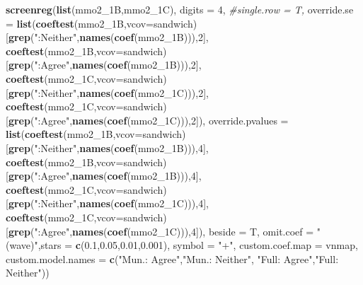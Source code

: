 \documentclass[
]{article}
\newenvironment{Shaded}{\begin{snugshade}}{\end{snugshade}}
\newcommand{\CommentTok}[1]{\textcolor[rgb]{0.56,0.35,0.01}{\textit{#1}}}
\newcommand{\DataTypeTok}[1]{\textcolor[rgb]{0.13,0.29,0.53}{#1}}
\newcommand{\DecValTok}[1]{\textcolor[rgb]{0.00,0.00,0.81}{#1}}
\newcommand{\FloatTok}[1]{\textcolor[rgb]{0.00,0.00,0.81}{#1}}
\newcommand{\KeywordTok}[1]{\textcolor[rgb]{0.13,0.29,0.53}{\textbf{#1}}}
\newcommand{\NormalTok}[1]{#1}
\newcommand{\StringTok}[1]{\textcolor[rgb]{0.31,0.60,0.02}{#1}}
\begin{document}
\begin{Shaded}
\begin{Highlighting}[]
\KeywordTok{screenreg}\NormalTok{(}\KeywordTok{list}\NormalTok{(mmo2_1B,mmo2_1C), }\DataTypeTok{digits =} \DecValTok{4}\NormalTok{, }\CommentTok{#single.row = T,}
          \DataTypeTok{override.se =} \KeywordTok{list}\NormalTok{(}\KeywordTok{coeftest}\NormalTok{(mmo2_1B,}\DataTypeTok{vcov=}\NormalTok{sandwich)[}\KeywordTok{grep}\NormalTok{(}\StringTok{":Neither"}\NormalTok{,}\KeywordTok{names}\NormalTok{(}\KeywordTok{coef}\NormalTok{(mmo2_1B))),}\DecValTok{2}\NormalTok{],}
                             \KeywordTok{coeftest}\NormalTok{(mmo2_1B,}\DataTypeTok{vcov=}\NormalTok{sandwich)[}\KeywordTok{grep}\NormalTok{(}\StringTok{":Agree"}\NormalTok{,}\KeywordTok{names}\NormalTok{(}\KeywordTok{coef}\NormalTok{(mmo2_1B))),}\DecValTok{2}\NormalTok{],}
                             \KeywordTok{coeftest}\NormalTok{(mmo2_1C,}\DataTypeTok{vcov=}\NormalTok{sandwich)[}\KeywordTok{grep}\NormalTok{(}\StringTok{":Neither"}\NormalTok{,}\KeywordTok{names}\NormalTok{(}\KeywordTok{coef}\NormalTok{(mmo2_1C))),}\DecValTok{2}\NormalTok{],}
                             \KeywordTok{coeftest}\NormalTok{(mmo2_1C,}\DataTypeTok{vcov=}\NormalTok{sandwich)[}\KeywordTok{grep}\NormalTok{(}\StringTok{":Agree"}\NormalTok{,}\KeywordTok{names}\NormalTok{(}\KeywordTok{coef}\NormalTok{(mmo2_1C))),}\DecValTok{2}\NormalTok{]),}
          \DataTypeTok{override.pvalues =} \KeywordTok{list}\NormalTok{(}\KeywordTok{coeftest}\NormalTok{(mmo2_1B,}\DataTypeTok{vcov=}\NormalTok{sandwich)[}\KeywordTok{grep}\NormalTok{(}\StringTok{":Neither"}\NormalTok{,}\KeywordTok{names}\NormalTok{(}\KeywordTok{coef}\NormalTok{(mmo2_1B))),}\DecValTok{4}\NormalTok{],}
                                  \KeywordTok{coeftest}\NormalTok{(mmo2_1B,}\DataTypeTok{vcov=}\NormalTok{sandwich)[}\KeywordTok{grep}\NormalTok{(}\StringTok{":Agree"}\NormalTok{,}\KeywordTok{names}\NormalTok{(}\KeywordTok{coef}\NormalTok{(mmo2_1B))),}\DecValTok{4}\NormalTok{],}
                                  \KeywordTok{coeftest}\NormalTok{(mmo2_1C,}\DataTypeTok{vcov=}\NormalTok{sandwich)[}\KeywordTok{grep}\NormalTok{(}\StringTok{":Neither"}\NormalTok{,}\KeywordTok{names}\NormalTok{(}\KeywordTok{coef}\NormalTok{(mmo2_1C))),}\DecValTok{4}\NormalTok{],}
                                  \KeywordTok{coeftest}\NormalTok{(mmo2_1C,}\DataTypeTok{vcov=}\NormalTok{sandwich)[}\KeywordTok{grep}\NormalTok{(}\StringTok{":Agree"}\NormalTok{,}\KeywordTok{names}\NormalTok{(}\KeywordTok{coef}\NormalTok{(mmo2_1C))),}\DecValTok{4}\NormalTok{]),}
          \DataTypeTok{beside =}\NormalTok{ T,}
          \DataTypeTok{omit.coef =} \StringTok{"(wave)"}\NormalTok{,}\DataTypeTok{stars =} \KeywordTok{c}\NormalTok{(}\FloatTok{0.1}\NormalTok{,}\FloatTok{0.05}\NormalTok{,}\FloatTok{0.01}\NormalTok{,}\FloatTok{0.001}\NormalTok{), }\DataTypeTok{symbol =} \StringTok{"+"}\NormalTok{,}
          \DataTypeTok{custom.coef.map =}\NormalTok{ vnmap,}
          \DataTypeTok{custom.model.names =} \KeywordTok{c}\NormalTok{(}\StringTok{"Mun.: Agree"}\NormalTok{,}\StringTok{"Mun.: Neither"}\NormalTok{,}
                                 \StringTok{"Full: Agree"}\NormalTok{,}\StringTok{"Full: Neither"}\NormalTok{))}
\end{Highlighting}
\end{Shaded}
\end{document}
